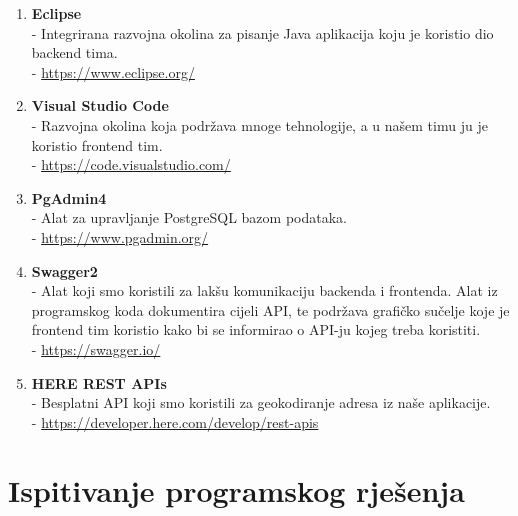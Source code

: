 \begin{enumerate}
				\item \textbf{Eclipse} \\
				- Integrirana razvojna okolina za pisanje Java aplikacija koju je koristio dio backend tima.\\
				- \url{https://www.eclipse.org/}
				
				\item \textbf{Visual Studio Code}\\
				- Razvojna okolina koja podržava mnoge tehnologije, a u našem timu ju je koristio frontend tim.\\
				- \url{https://code.visualstudio.com/}
				
				\item \textbf{PgAdmin4}\\
				- Alat za upravljanje PostgreSQL bazom podataka.\\
				- \url{https://www.pgadmin.org/}
				
				\item \textbf{Swagger2}\\
				- Alat koji smo koristili za lakšu komunikaciju backenda i frontenda. Alat iz programskog koda dokumentira cijeli API, te podržava grafičko sučelje koje je frontend tim koristio kako bi se informirao o API-ju kojeg treba koristiti.\\
				- \url{https://swagger.io/}
				
				\item \textbf{HERE REST APIs}\\
				- Besplatni API koji smo koristili za geokodiranje adresa iz naše aplikacije.\\
				- \url{https://developer.here.com/develop/rest-apis}
				
			\end{enumerate}
		 
			
			\eject 
		
	
		\section{Ispitivanje programskog rješenja}
			
%			
%	
			
